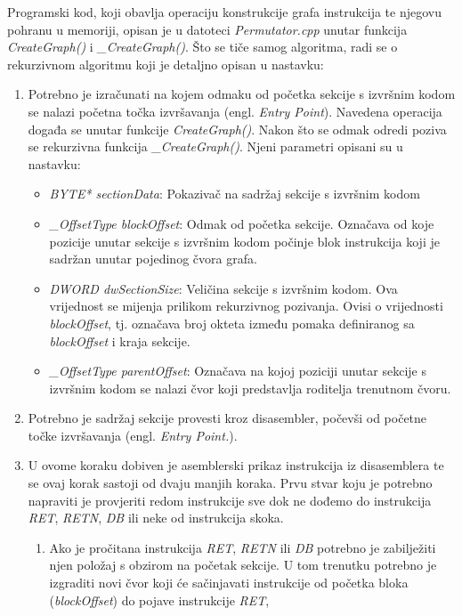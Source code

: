 \documentclass[times, utf8, diplomski, numeric]{fer}
\begin{document}
Programski kod, koji obavlja operaciju konstrukcije grafa instrukcija te
njegovu pohranu u memoriji, opisan je u datoteci \emph{Permutator.cpp} unutar
funkcija \emph{CreateGraph()} i \emph{\_CreateGraph()}. Što se tiče samog
algoritma, radi se o rekurzivnom algoritmu koji je detaljno opisan u nastavku:

\begin{enumerate}
\item Potrebno je izračunati na kojem odmaku od početka sekcije s izvršnim
kodom se nalazi početna točka izvršavanja (engl. \emph{Entry Point}). Navedena
operacija događa se unutar funkcije \emph{CreateGraph()}. Nakon što se odmak
odredi poziva se rekurzivna funkcija \emph{\_CreateGraph()}. Njeni parametri
opisani su u nastavku:
\begin{itemize}
\item \emph{BYTE* sectionData}: Pokazivač na sadržaj sekcije s izvršnim kodom
\item \emph{\_OffsetType blockOffset}: Odmak od početka sekcije. Označava od
koje pozicije unutar sekcije s izvršnim kodom počinje blok instrukcija koji je
sadržan unutar pojedinog čvora grafa.
\item \emph{DWORD dwSectionSize}: Veličina sekcije s izvršnim kodom. Ova
vrijednost se mijenja prilikom rekurzivnog pozivanja. Ovisi o vrijednosti
\emph{blockOffset}, tj. označava broj okteta između pomaka definiranog sa
\emph{blockOffset} i kraja sekcije.
\item \emph{\_OffsetType parentOffset}: Označava na kojoj poziciji unutar
sekcije s izvršnim kodom se nalazi čvor koji predstavlja roditelja trenutnom
čvoru.
\end{itemize} 
\item Potrebno je sadržaj sekcije provesti kroz disasembler, počevši od početne
točke izvršavanja (engl. \emph{Entry Point.}).
\item U ovome koraku dobiven je asemblerski prikaz instrukcija iz disasemblera
te se ovaj korak sastoji od dvaju manjih koraka. Prvu stvar koju je potrebno
napraviti je provjeriti redom instrukcije sve dok ne dođemo do instrukcija
\emph{RET}, \emph{RETN}, \emph{DB} ili neke od instrukcija skoka.
\begin{enumerate}
\item Ako je pročitana instrukcija \emph{RET}, \emph{RETN} ili \emph{DB}
potrebno je zabilježiti njen položaj s obzirom na početak sekcije. U tom
trenutku potrebno je izgraditi novi čvor koji će sačinjavati instrukcije od
početka bloka (\emph{blockOffset}) do pojave instrukcije \emph{RET},

\end{enumerate}
\end{enumerate}
\end{document}
